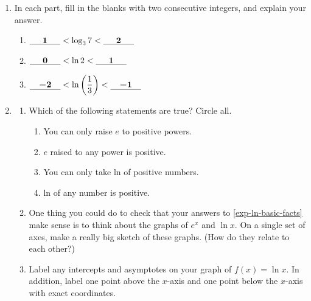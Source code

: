 \documentclass{article}
\begin{document}
\begin{enumerate}
\item 
  In each part, fill in the blanks with two consecutive integers, and explain your answer.
  \begin{enumerate}

  \item
    \begin{problem}[0.1in]
      $\cfitb{0.5in}{1} < \log_3 7 < \cfitb{0.5in}{2}$
    \end{problem}

  \item \label{estimate-ln2}
    \begin{problem}[0.1in]
      $\cfitb{0.5in}{0} < \ln 2 < \cfitb{0.5in}{1}$
    \end{problem}

  \item
    \begin{problem}[0.1in]
      $\displaystyle \cfitb{0.5in}{-2} < \ln \left( \frac{1}{3} \right) < \cfitb{0.5in}{-1}$
    \end{problem}

  \end{enumerate}

\item  \label{exp-ln-domain-range}
  \begin{enumerate}
  \item \label{exp-ln-basic-facts}
    \begin{problem}
      Which of the following statements are true? Circle all.
      \begin{enumerate}[label=\Alph*.]
      \item You can only raise $e$ to positive powers.
      \item $e$ raised to any power is positive.
      \item You can only take ln of positive numbers.
      \item ln of any number is positive.
      \end{enumerate}
    \end{problem}

  \item
    \begin{problem}[\vfill]
      One thing you could do to check that your answers to \ref{exp-ln-basic-facts} make sense is to think about the graphs of $e^x$ and $\ln x$. On a single set of axes, make a really big sketch of these graphs. (How do they relate to each other?)
    \end{problem}

  \item \label{ln-points}
    \begin{problem}[\nstretch{0.25}]
      Label any intercepts and asymptotes on your graph of $f(x) = \ln x$. In addition, label one point above the $x$-axis and one point below the $x$-axis with exact coordinates.%
    \end{problem}


\end{enumerate}
\end{enumerate}
\end{document}
